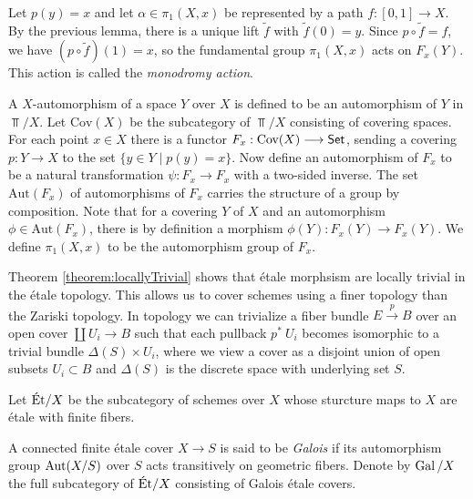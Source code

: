 \begin{construction}
	Let $p(y)=x$ and let $\alpha \in \pi_1(X,x)$ be represented by a path $f: [0,1] \to X$. By the previous lemma, there is a unique lift $\tilde{f}$ with $\tilde{f}(0) = y$. Since $p \circ \tilde{f} = f$, we have $(p \circ \tilde{f})(1) = x$, so the fundamental group $\pi_1(X, x)$ acts on $F_x(Y)$. This action is called the \textit{monodromy action}.
\end{construction}

A $X$-automorphism of a space $Y$ over $X$ is defined to be an automorphism of $Y$ in $\Top/X$. Let $\text{Cov}(X)$ be the subcategory of $\Top/X$ consisting of covering spaces. For each point $x \in X$ there is a functor $F_x: \text{Cov}(X) \longrightarrow \mathsf{Set}$, sending a covering $p: Y \to X$ to the set $\{y \in Y \mid p(y) = x\}$. Now define an automorphism of $F_x$ to be a natural transformation $\psi: F_x \to F_x$ with a two-sided inverse. The set $\text{Aut}(F_x)$ of automorphisms of $F_x$ carries the structure of a group by composition. Note that for a covering $Y$ of $X$ and an automorphism $\phi \in \text{Aut}(F_x)$, there is by definition a morphism $\phi(Y): F_x(Y) \to F_x(Y)$. We define $\pi_1(X,x)$ to be the automorphism group of $F_x$.

\begin{remark}
	Theorem \ref{theorem:locallyTrivial} shows that \'etale morphsism are locally trivial in the \'etale topology. This allows us to cover schemes using a finer topology than the Zariski topology. In topology we can trivialize a fiber bundle $E \stackrel{p}{\to} B$ over an open cover $\coprod U_i \to B$ such that each pullback $p^*\ U_i $ becomes isomorphic to a trivial bundle $\Delta(S) \times U_i$, where we view a cover as a disjoint union of open subsets $U_i \subset B$ and $\Delta(S)$ is the discrete space with underlying set $S$.
\end{remark}

\begin{definition}
	Let $\text{\'Et}/X$ be the subcategory of schemes over $X$ whose sturcture maps to $X$ are \'etale with finite fibers.
\end{definition}

\begin{definition}
	A connected finite \'etale cover $X \to S$ is said to be \textit{Galois} if its automorphism group $\operatorname{Aut}(X/S)$ over $S$ acts transitively on geometric fibers. Denote by $\operatorname{Gal}/X$ the full subcategory of $\text{\'Et}/X$ consisting of Galois \'etale covers.
\end{definition}

